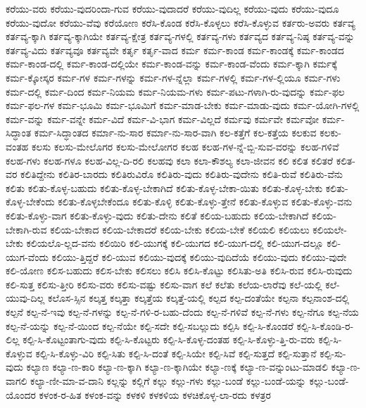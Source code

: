 {ಕರೆಯು-ವರು
ಕರೆಯು-ವುದರಿಂದಾ-ಗುವ
ಕರೆಯು-ವುದಾದರೆ
ಕರೆಯು-ವುದಿಲ್ಲ
ಕರೆಯು-ವುದು
ಕರೆಯು-ವುದೂ
ಕರೆಯು-ವುದೋ
ಕರೆಯು-ವೆವು
ಕರೆಯೋಣ
ಕರೆಸಿ-ಕೊಂಡ
ಕರೆಸಿ-ಕೊಳ್ಳಲು
ಕರೆಸಿ-ಕೊಳ್ಳುವ
ಕರ್ತರು-ಅವರು
ಕರ್ತವ್ಯ
ಕರ್ತವ್ಯ-ಕ್ಕಾಗಿ
ಕರ್ತವ್ಯ-ಕ್ಕಾಗಿಯೇ
ಕರ್ತವ್ಯ-ಕ್ಷೇತ್ರ
ಕರ್ತವ್ಯ-ಗಳಲ್ಲಿ
ಕರ್ತವ್ಯ-ಗಳು
ಕರ್ತವ್ಯದ
ಕರ್ತವ್ಯ-ನಿಷ್ಠ
ಕರ್ತವ್ಯ-ವನ್ನು
ಕರ್ತವ್ಯ-ವಿದು
ಕರ್ತವ್ಯವೂ
ಕರ್ತವ್ಯವೇ
ಕರ್ತೃ
ಕರ್ತೃ-ವಾದ
ಕರ್ಮ
ಕರ್ಮ-ಕಾಂಡ
ಕರ್ಮ-ಕಾಂಡಕ್ಕೆ
ಕರ್ಮ-ಕಾಂಡದ
ಕರ್ಮ-ಕಾಂಡ-ದಲ್ಲಿ
ಕರ್ಮ-ಕಾಂಡ-ದಲ್ಲಿಯೇ
ಕರ್ಮ-ಕಾಂಡ-ವನ್ನು
ಕರ್ಮ-ಕಾಂಡ-ವೆಂದು
ಕರ್ಮ-ಕ್ಕಾಗಿ
ಕರ್ಮಕ್ಕೆ
ಕರ್ಮ-ಕ್ಕೋಸ್ಕರ
ಕರ್ಮ-ಗಳ
ಕರ್ಮ-ಗಳನ್ನು
ಕರ್ಮ-ಗಳ-ನ್ನೆಲ್ಲಾ
ಕರ್ಮ-ಗಳಲ್ಲಿ
ಕರ್ಮ-ಗಳ-ಲ್ಲಿಯೂ
ಕರ್ಮ-ಗಳು
ಕರ್ಮ-ದಲ್ಲಿ
ಕರ್ಮ-ದಿಂದ
ಕರ್ಮ-ನಿಯಮ
ಕರ್ಮ-ನಿಯಮ-ಗಳು
ಕರ್ಮ-ಪಟು-ಗಳಾಗಿ-ರು-ವುದನ್ನು
ಕರ್ಮ-ಫಲ
ಕರ್ಮ-ಫಲ-ಗಳ
ಕರ್ಮ-ಭೂಮಿ
ಕರ್ಮ-ಭೂಮಿಗೆ
ಕರ್ಮ-ಮಾಡ-ಬೇಕು
ಕರ್ಮ-ಮಾಡು-ವುದು
ಕರ್ಮ-ಯೋಗಿ-ಗಳಲ್ಲಿ
ಕರ್ಮ-ವನ್ನು
ಕರ್ಮ-ವನ್ನೇ
ಕರ್ಮ-ವಿದೆ
ಕರ್ಮ-ವಿ-ಭಾಗ
ಕರ್ಮ-ವಿಲ್ಲದೆ
ಕರ್ಮವು
ಕರ್ಮವೇ
ಕರ್ಮವೋ
ಕರ್ಮ-ಸಿದ್ಧಾಂತ
ಕರ್ಮ-ಸಿದ್ಧಾಂತದ
ಕರ್ಮಾ-ನು-ಸಾರ
ಕರ್ಮಾ-ನು-ಸಾರ-ವಾಗಿ
ಕಲ-ಕತ್ತೆಗೆ
ಕಲ-ಕತ್ತೆಯ
ಕಲಕುವ
ಕಲಕು-ವಂತಹ
ಕಲಸು
ಕಲಸು-ಮೇಲೊಗರ
ಕಲಸು-ಮೇಲೋಗರ
ಕಲಹ
ಕಲಹ-ಗಳ-ನ್ನೆ-ಬ್ಬಿ-ಸುವ-ವರನ್ನು
ಕಲಹ-ಗಳಿವೆ
ಕಲಹ-ಗಳು
ಕಲಹ-ಗಳೂ
ಕಲಹ-ವಿಲ್ಲ-ದಿ-ರಲಿ
ಕಲಹವು
ಕಲಾ
ಕಲಾ-ಕೌಶಲ್ಯ
ಕಲಾ-ಜೀವನ
ಕಲಿ
ಕಲಿತ
ಕಲಿತರೆ
ಕಲಿತ-ವರ
ಕಲಿತಿದ್ದೇನು
ಕಲಿತಿರ-ಬಾರದು
ಕಲಿತಿರುವಿರೊ
ಕಲಿತಿರು-ವುದು
ಕಲಿತಿರು-ವುದೇನು
ಕಲಿತಿ-ರುವೆ
ಕಲಿತಿರು-ವೆನು
ಕಲಿತು
ಕಲಿತು-ಕೊಳ್ಳ-ಬಹುದು
ಕಲಿತು-ಕೊಳ್ಳ-ಬೇಕಾಗಿದೆ
ಕಲಿತು-ಕೊಳ್ಳ-ಬೇಕಾ-ಯಿತು
ಕಲಿತು-ಕೊಳ್ಳ-ಬೇಕು
ಕಲಿತು-ಕೊಳ್ಳ-ಬೇಕೆಂದು
ಕಲಿತು-ಕೊಳ್ಳಬೇಕೆಂದೂ
ಕಲಿತು-ಕೊಳ್ಳಿ
ಕಲಿತು-ಕೊಳ್ಳು-ತ್ತೇನೆ
ಕಲಿತು-ಕೊಳ್ಳುವ
ಕಲಿತು-ಕೊಳ್ಳು-ವನು
ಕಲಿತು-ಕೊಳ್ಳು-ವಾಗ
ಕಲಿತು-ಕೊಳ್ಳು-ವುದು
ಕಲಿತು-ದೇನು
ಕಲಿತೆ
ಕಲಿಯ-ಬಹುದು
ಕಲಿಯ-ಬೇಕಾಗಿದೆ
ಕಲಿಯ-ಬೇಕಾಗಿ-ರುವ
ಕಲಿಯ-ಬೇಕಾದ
ಕಲಿಯ-ಬೇಕಾದರೆ
ಕಲಿಯ-ಬೇಕು
ಕಲಿಯ-ಬೇಕೆ
ಕಲಿಯಲಿ
ಕಲಿಯಲು
ಕಲಿಯಲೇ-ಬೇಕು
ಕಲಿಯಲೊ-ಲ್ಲದ-ವನು
ಕಲಿಯಿರಿ
ಕಲಿ-ಯುಗಕ್ಕೆ
ಕಲಿ-ಯುಗದ
ಕಲಿ-ಯುಗ-ದಲ್ಲಿ
ಕಲಿ-ಯುಗ-ದಲ್ಲೂ
ಕಲಿ-ಯುಗ-ವೆಂದು
ಕಲಿಯು-ತ್ತಿದ್ದರೆ
ಕಲಿ-ಯುವ
ಕಲಿಯು-ವುದಕ್ಕೆ
ಕಲಿಯು-ವುದಿದೆಯೆ
ಕಲಿಯು-ವುದು
ಕಲಿಯು-ವುದೇ
ಕಲಿ-ಯೋಣ
ಕಲಿಸ-ಬಹುದು
ಕಲಿಸ-ಬೇಕು
ಕಲಿಸಲು
ಕಲಿಸಿ
ಕಲಿಸಿ-ಕೊಟ್ಟು
ಕಲಿಸಿತು-ಅತಿ
ಕಲಿಸಿ-ರುವ
ಕಲಿಸಿ-ರುವುದು
ಕಲಿ-ಸುತ್ತ
ಕಲಿಸು-ತ್ತೀರಿ
ಕಲಿಸು-ವರು
ಕಲಿಸು-ವಷ್ಟು
ಕಲಿಸು-ವಾಗ
ಕಲೆ
ಕಲೆತು
ಕಲೆಯ-ಲಾರೆವು
ಕಲೆ-ಯಲ್ಲಿ
ಕಲೆ-ಯುವು-ದಿಲ್ಲ
ಕಲೊಸ-ಸ್ಸಿನ
ಕಲ್ಕತ್ತ
ಕಲ್ಕತ್ತಾ
ಕಲ್ಕತ್ತೆಯ
ಕಲ್ಕತ್ತೆ-ಯಲ್ಲಿ
ಕಲ್ಪದ
ಕಲ್ಪ-ದಂತೆಯೇ
ಕಲ್ಪನಾ
ಕಲ್ಪನಾಂಶ-ದಲ್ಲಿ
ಕಲ್ಪನೆ
ಕಲ್ಪ-ನೆ-ಇವು
ಕಲ್ಪ-ನೆ-ಗಳನ್ನು
ಕಲ್ಪ-ನೆ-ಗಳಿ-ರ-ಬಹು-ದೆಂದು
ಕಲ್ಪ-ನೆ-ಗಳಿವೆ
ಕಲ್ಪ-ನೆ-ಗಳು
ಕಲ್ಪ-ನೆಗೂ
ಕಲ್ಪ-ನೆಯ
ಕಲ್ಪ-ನೆ-ಯನ್ನು
ಕಲ್ಪ-ನೆ-ಯಿಂದ
ಕಲ್ಪ-ನೆಯೇ
ಕಲ್ಪಿ-ಸದೇ
ಕಲ್ಪಿ-ಸಬಲ್ಲುದು
ಕಲ್ಪಿಸಿ
ಕಲ್ಪಿ-ಸಿ-ಕೊಂಡರೆ
ಕಲ್ಪಿ-ಸಿ-ಕೊಂಡಿ-ರ-ಲಿಲ್ಲ
ಕಲ್ಪಿ-ಸಿ-ಕೊಟ್ಟಂತಾಗು-ವುದು
ಕಲ್ಪಿ-ಸಿ-ಕೊಟ್ಟರು
ಕಲ್ಪಿ-ಸಿ-ಕೊಳ್ಳ-ದಂತಹ
ಕಲ್ಪಿ-ಸಿ-ಕೊಳ್ಳು-ತ್ತಿ-ರು-ವರು
ಕಲ್ಪಿ-ಸಿ-ಕೊಳ್ಳುವ
ಕಲ್ಪಿ-ಸಿ-ಕೊಳ್ಳು-ವಿರಿ
ಕಲ್ಪಿ-ಸಿತು
ಕಲ್ಪಿ-ಸಿ-ದಂತೆ
ಕಲ್ಪಿ-ಸಿಯೇ
ಕಲ್ಪಿ-ಸಿವೆ
ಕಲ್ಪಿ-ಸುತ್ತದೆ
ಕಲ್ಪಿ-ಸುತ್ತಾನೆ
ಕಲ್ಪಿ-ಸು-ವುದು
ಕಲ್ಯಾಣ
ಕಲ್ಯಾ-ಣ-ಕಾರಿ
ಕಲ್ಯಾ-ಣ-ಕ್ಕಾಗಿ
ಕಲ್ಯಾ-ಣ-ಕ್ಕಾಗಿಯೇ
ಕಲ್ಯಾ-ಣಕ್ಕೆ
ಕಲ್ಯಾ-ಣ-ವನ್ನುಂಟು-ಮಾಡಲಿ
ಕಲ್ಯಾ-ಣ-ವಾಗಲಿ
ಕಲ್ಯಾ-ಣೀ-ಮಾ-ವ-ದಾನಿ
ಕಲ್ಲನ್ನು
ಕಲ್ಲಿಗೆ
ಕಲ್ಲು
ಕಲ್ಲು-ಗಳು
ಕಲ್ಲು-ಬಂಡೆ
ಕಲ್ಲು-ಬಂಡೆ-ಯನ್ನು
ಕಲ್ಲು-ಬಂಡೆ-ಯೊಂದರ
ಕಳಂಕ-ರ-ಹಿತ
ಕಳಂಕ-ವನ್ನು
ಕಳಕಳಿ
ಕಳಕಳಿಯ
ಕಳಚಿಕೊಳ್ಳ-ಲಾ-ರದು
ಕಳತ್ರರ
}
